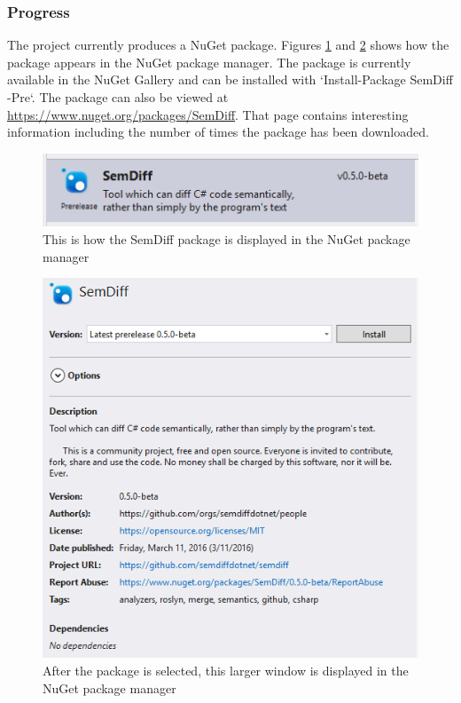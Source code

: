 \documentclass[draftclsnofoot,onecolumn]{IEEEtran}
\begin{document}
\subsubsection{Progress}
The project currently produces a NuGet package. Figures \ref{pacmansmall} and 
\ref{pacman} shows how the package appears in the NuGet package manager. The 
package is currently available in the NuGet Gallery and can be installed with 
`Install-Package SemDiff -Pre`. The package can also be viewed at 
\url{https://www.nuget.org/packages/SemDiff}. That page contains interesting 
information including the number of times the package has been downloaded.

\begin{figure}[!htb]
\centering
\includegraphics[scale=1]{SemDiffInPackageManagerSmall}
\caption{This is how the SemDiff package is displayed in the NuGet package 
manager}
\label{pacmansmall}
\end{figure}

\begin{figure}[!htb]
\centering
\includegraphics[scale=.8]{SemDiffInPackageManager}
\caption{After the package is selected, this larger window is displayed in the 
NuGet package manager}
\label{pacman}
\end{figure}
\end{document}
